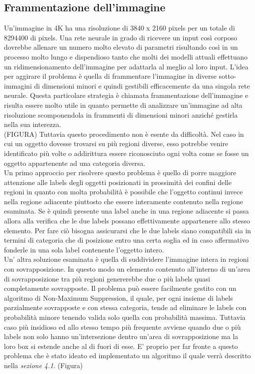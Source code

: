 \subsection{Frammentazione dell'immagine}
Un'immagine in 4K ha una risoluzione di 3840 x 2160 pixels per un totale di 8294400 di pixels. Una rete neurale in grado di ricevere un input così corposo dovrebbe allenare un numero molto elevato di parametri risultando così in un processo molto lungo e dispendioso tanto che molti dei modelli attuali effettuano un ridimensionamento dell'immagine per adattarla al meglio al loro input. L'idea per aggirare il problema è quella di frammentare l'immagine in diverse sotto-immagini di dimensioni minori e quindi gestibili efficacemente da una singola rete neurale. Questa particolare strategia è chiamata frammentazione dell'immagine e risulta essere molto utile in quanto permette di analizzare un'immagine ad alta risoluzione scomponendola in frammenti di dimensioni minori anziché gestirla nella sua interezza.\\
(FIGURA)
Tuttavia questo procedimento non è esente da difficoltà.  Nel caso in cui un oggetto dovesse trovarsi su più regioni diverse, esso potrebbe venire identificato più volte o addirittura essere riconosciuto ogni volta come se fosse un oggetto appartenente ad una categoria diversa.\\
Un primo approccio per risolvere questo problema è quello di porre maggiore attenzione alle labels degli oggetti posizionati in prossimità dei confini delle regioni in quanto con molta probabilità è possibile che l'oggetto continui invece nella regione adiacente piuttosto che essere interamente contenuto nella regione esaminata. Se è quindi presente una label anche in una regione adiacente si passa allora alla verifica che le due labels possano effettivamente appartenere allo stesso elemento. Per fare ciò bisogna assicurarsi che le due labels siano compatibili sia in termini di categoria  che di posizione entro una certa soglia ed in caso affermativo fonderle in una sola label contenente l'oggetto intero.\\
Un' altra soluzione esaminata è quella di suddividere l'immagine intera in regioni con sovrapposizione. In questo modo un elemento contenuto all'interno di un'area di sovrapposizione tra più regioni genererebbe due o più labels quasi completamente sovrapposte. Il problema può essere facilmente gestito con un algoritmo di Non-Maximum Suppression, il quale, per ogni insieme di labels parzialmente sovrapposte e con stessa categoria, tende ad eliminare le labels con probabilità minore tenendo valida solo quella con probabilità massima. Tuttavia caso più insidioso ed allo stesso tempo più frequente avviene quando due o più labels non solo hanno un'intersezione dentro un'area di sovrapposizione ma la loro box si estende anche al di fuori di esse. E' proprio per far fronte a questo problema che è stato ideato ed implementato un algoritmo il quale verrà descritto nella \textit{sezione 4.1}.
(Figura)